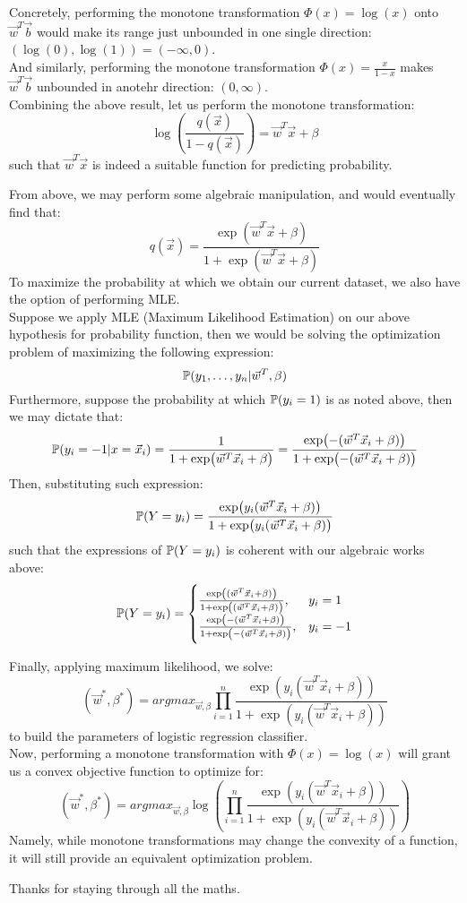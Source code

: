 Concretely, performing the monotone transformation $\Phi(x) = \log (x)$ onto $\vec{w}^T \vec{b}$ would make its range just unbounded in one single direction: $(\log(0), \log(1)) = (-\infty, 0)$. \\
And similarly, performing the monotone transformation $\Phi(x) = \frac{x}{1 - x}$ makes $\vec{w}^T \vec{b}$ unbounded in anotehr direction: $(0, \infty)$. \\
Combining the above result, let us perform the monotone transformation:
\[
    \log (\frac{q(\vec{x})}{1 - q(\vec{x})}) = \vec{w}^T \vec{x} + \beta
\]
such that $\vec{w}^T \vec{x}$ is indeed a suitable function for predicting probability.

From above, we may perform some algebraic manipulation, and would eventually find that:
\[
    q(\vec{x}) = \frac{\exp (\vec{w}^T \vec{x} + \beta)}{1 + \exp (\vec{w}^T \vec{x} + \beta)}
\]
To maximize the probability at which we obtain our current dataset, we also have the option of performing MLE. \\
Suppose we apply MLE (Maximum Likelihood Estimation) on our above hypothesis for probability function, then we would be solving the optimization problem of maximizing the following expression:
\[
    \P(y_1, \dots, y_n | \vec{w}^T, \beta)
\]
Furthermore, suppose the probability at which $\P(y_i = 1)$ is as noted above, then we may dictate that:
\[
    \P(y_i = -1 | x = \vec{x}_i) = \frac{1}{1 + \exp (\vec{w}^T \vec{x}_i + \beta)} = \frac{\exp (- (\vec{w}^T \vec{x}_i + \beta))}{1 + \exp (- (\vec{w}^T \vec{x}_i + \beta))}
\]
Then, substituting such expression:
\begin{align*}
    \P(Y = y_i) = \frac{ \exp (y_i (\vec{w}^T \vec{x}_i + \beta))}{1 + \exp (y_i (\vec{w}^T \vec{x}_i + \beta))}
\end{align*}
such that the expressions of $\P(Y = y_i)$ is coherent with our algebraic works above:
\[
    \P(Y = y_i) =
    \begin{cases}
        \frac{ \exp ( (\vec{w}^T \vec{x}_i + \beta))}{1 + \exp ( (\vec{w}^T \vec{x}_i + \beta))}, &y_i = 1 \\
        \frac{ \exp (- (\vec{w}^T \vec{x}_i + \beta))}{1 + \exp (- (\vec{w}^T \vec{x}_i + \beta))}, &y_i = -1
    \end{cases}
\]

Finally, applying maximum likelihood, we solve:
\[
    (\vec{w}^*, \beta^*) = {argmax}_{\vec{w}, \beta} \prod_{i = 1}^n \frac{ \exp (y_i (\vec{w}^T \vec{x}_i + \beta))}{1 + \exp (y_i (\vec{w}^T \vec{x}_i + \beta))}
\]
to build the parameters of logistic regression classifier. \\
Now, performing a monotone transformation with $\Phi(x) = \log(x)$ will grant us a convex objective function to optimize for:
\[
    (\vec{w}^*, \beta^*) = {argmax}_{\vec{w}, \beta} \log (\prod_{i = 1}^n \frac{ \exp (y_i (\vec{w}^T \vec{x}_i + \beta))}{1 + \exp (y_i (\vec{w}^T \vec{x}_i + \beta))})
\]
Namely, while monotone transformations may change the convexity of a function, it will still provide an equivalent optimization problem.

Thanks for staying through all the maths.
